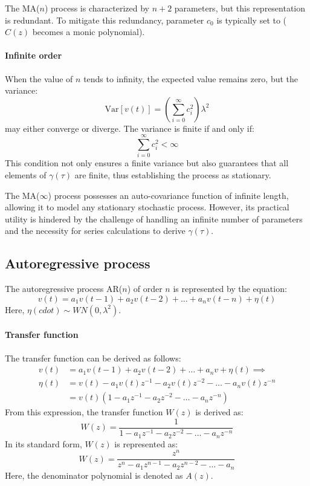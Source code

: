 The MA($n$) process is characterized by $n+2$ parameters, but this representation is redundant. 
To mitigate this redundancy, parameter $c_0$ is typically set to ($C(z)$ becomes a monic polynomial).

\paragraph*{Infinite order}
When the value of $n$ tends to infinity, the expected value remains zero, but the variance:
\[\text{Var}\left[v(t)\right]=\left( \sum_{i=0}^\infty c_{i}^{2}\right) \lambda^2\]
may either converge or diverge. 
The variance is finite if and only if:
\[\sum_{i=0}^\infty c_i^2 < \infty\]
This condition not only ensures a finite variance but also guarantees that all elements of $\gamma(\tau)$ are finite, thus establishing the process as stationary.

The MA($\infty$) process possesses an auto-covariance function of infinite length, allowing it to model any stationary stochastic process. 
However, its practical utility is hindered by the challenge of handling an infinite number of parameters and the necessity for series calculations to derive $\gamma(\tau)$. 

\subsection{Autoregressive process}
The autoregressive process AR($n$) of order $n$ is represented by the equation:
\[v(t)=a_1v(t-1)+a_2v(t-2)+\dots+a_nv(t-n)+\eta(t)\]
Here, $\eta(cdot)\sim WN(0,\lambda^2)$. 

\paragraph*{Transfer function}
The transfer function can be derived as follows:
\begin{align*}
    v(t)    &= a_1v(t-1)+a_2v(t-2)+\dots+a_nv+\eta(t) \implies \\
    \eta(t) &= v(t) - a_1v(t)z^{-1} - a_2v(t)z^{-2} - \dots - a_nv(t)z^{-n} \\
            &= v(t)\left( 1 - a_1z^{-1} - a_2z^{-2} - \dots - a_nz^{-n}\right) 
\end{align*}
From this expression, the transfer function $W(z)$ is derived as:
\[W(z)=\dfrac{1}{1 - a_1z^{-1} - a_2z^{-2} - \dots - a_nz^{-n}}\]
In its standard form, $W(z)$ is represented as:
\[W(z)=\dfrac{z^n}{z^n - a_1z^{n-1} - a_2z^{n-2} - \dots - a_n}\]
Here, the denominator polynomial is denoted as $A(z)$. 

